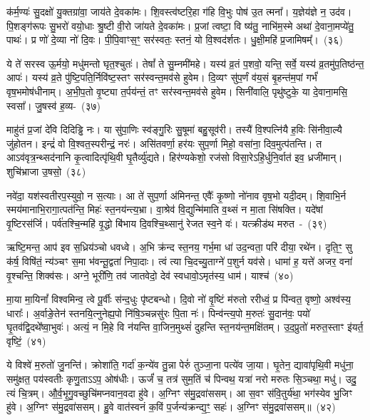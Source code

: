 क॑र्म॒ण्यः॑ सु॒दक्षो॑ यु॒क्तग्रा॑वा॒ जाय॑ते दे॒वका॑मः। शि॒वस्त्व॑ष्टरि॒हा ग॑हि वि॒भुः पोष॑ उ॒त त्मना᳚। य॒ज्ञेय॑ज्ञे न॒ उद॑व। पि॒शङ्ग॑रूपः सु॒भरो॑ वयो॒धाः श्रु॒ष्टी वी॒रो जा॑यते दे॒वका॑मः। प्र॒जां त्वष्टा॒ वि ष्य॑तु॒ नाभि॑म॒स्मे अथा॑ दे॒वाना॒मप्ये॑तु॒ पाथः॑। प्र णो॑ दे॒व्या नो॑ दि॒वः। पी॒पि॒वाꣳस॒ꣳ॒ सर॑स्वतः॒ स्तनं॒ यो वि॒श्वद॑र्\mbox{}शतः। धु॒क्षी॒महि॑ प्र॒जामिषम्᳚।~(३६)

ये ते॑ सरस्व ऊ॒र्मयो॒ मधु॑मन्तो घृत॒श्चुतः॑। तेषां᳚ ते सु॒म्नमी॑महे। यस्य॑ व्र॒तं प॒शवो॒ यन्ति॒ सर्वे॒ यस्य॑ व्र॒तमु॑प॒तिष्ठ॑न्त॒ आपः॑। यस्य॑ व्र॒ते पु॑ष्टि॒पति॒र्निवि॑ष्ट॒स्तꣳ सर॑स्वन्त॒मव॑से हुवेम। दि॒व्यꣳ सु॑प॒र्णं व॑य॒सं बृ॒हन्त॑म॒पां गर्भं॑ वृष॒भमोष॑धीनाम्। अ॒भी॒प॒तो वृ॒ष्ट्या त॒र्पय॑न्तं॒ तꣳ सर॑स्वन्त॒मव॑से हुवेम। सिनी॑वालि॒ पृथु॑ष्टुके॒ या दे॒वाना॒मसि॒ स्वसा᳚। जु॒षस्व॑ ह॒व्य-~(३७)

माहु॑तं प्र॒जां दे॑वि दिदिड्ढि नः। या सु॑पा॒णिः स्व॑ङ्गु॒रिः सु॒षूमा॑ बहु॒सूव॑री। तस्यै॑ वि॒श्पत्नि॑यै ह॒विः सि॑नीवा॒ल्यै जु॑होतन। इन्द्रं॑ वो वि॒श्वत॒स्परीन्द्रं॒ नरः॑। असि॑तवर्णा॒ हर॑यः सुप॒र्णा मिहो॒ वसा॑ना॒ दिव॒मुत्प॑तन्ति। त आ\-ऽव॑वृत्र॒न्थ्सद॑नानि कृ॒त्वादित्पृ॑थि॒वी घृ॒तैर्व्यु॑द्यते। हिर॑ण्यकेशो॒ रज॑सो विसा॒रे\-ऽहि॒र्धुनि॒र्वात॑ इव॒ ध्रजी॑मान्। शुचि॑भ्राजा उ॒षसो॒~(३८)

नवे॑दा॒ यश॑स्वतीरप॒स्युवो॒ न स॒त्याः। आ ते॑ सुप॒र्णा अ॑मिनन्त॒ एवैः᳚ कृ॒ष्णो नो॑नाव वृष॒भो यदी॒दम्। शि॒वाभि॒र्न स्मय॑\-माना\-भि॒रागा॒त्पत॑न्ति॒ मिहः॑ स्त॒नय॑न्त्य॒भ्रा। वा॒श्रेव॑ वि॒द्युन्मि॑माति व॒थ्सं न मा॒ता सि॑षक्ति। यदे॑षां वृ॒ष्टिरस॑र्जि। पर्व॑तश्चि॒न्महि॑ वृ॒द्धो बि॑भाय दि॒वश्चि॒थ्सानु॑ रेजत स्व॒ने वः॑। यत्क्रीड॑थ मरुत~-~(३९)

ऋष्टि॒मन्त॒ आप॑ इव स॒ध्रिय॑ञ्चो धवध्वे। अ॒भि क्र॑न्द स्त॒नय॒ गर्भ॒मा धा॑ उद॒न्वता॒ परि॑ दीया॒ रथे॑न। दृति॒ꣳ॒ सु क॑र्\mbox{}ष॒ विषि॑तं॒ न्य॑ञ्चꣳ स॒मा भ॑वन्तू॒द्वता॑ निपा॒दाः। त्वं त्या चि॒दच्यु॒ताग्ने॑ प॒शुर्न यव॑से। धामा॑ ह॒ यत्ते॑ अजर॒ वना॑ वृ॒श्चन्ति॒ शिक्व॑सः। अग्ने॒ भूरी॑णि॒ तव॑ जातवेदो॒ देव॑ स्वधावो॒\-ऽमृत॑स्य॒ धाम॑। याश्च॑~(४०)

मा॒या मा॒यिनां᳚ विश्वमिन्व॒ त्वे पू॒र्वीः स॑न्द॒धुः पृ॑ष्टबन्धो। दि॒वो नो॑ वृ॒ष्टिं म॑रुतो ररीध्वं॒ प्र पि॑न्वत॒ वृष्णो॒ अश्व॑स्य॒ धाराः᳚। अ॒र्वाङे॒तेन॑ स्तनयि॒त्नुनेह्य॒पो नि॑षि॒ञ्चन्नसु॑रः पि॒ता नः॑। पिन्व॑न्त्य॒पो म॒रुतः॑ सु॒\-दान॑वः॒ पयो॑ घृ॒तव॑द्वि॒दथे᳚ष्वा॒भुवः॑। अत्यं॒ न मि॒हे वि न॑यन्ति वा॒जिन॒\-मुथ्सं॑ दुहन्ति स्त॒नय॑न्त॒मक्षि॑तम्। उ॒द॒प्रुतो॑ मरुत॒स्ताꣳ इ॑यर्त॒ वृष्टिं॒~(४१)

ये विश्वे॑ म॒रुतो॑ जु॒नन्ति॑। क्रोशा॑ति॒ गर्दा॑ क॒न्ये॑व तु॒न्ना पेरुं॑ तुञ्जा॒ना पत्ये॑व जा॒या। घृ॒तेन॒ द्यावा॑पृथि॒वी मधु॑ना॒ समु॑क्षत॒ पय॑स्वतीः कृणु॒ताऽऽप॒ ओष॑धीः। ऊर्जं॑ च॒ तत्र॑ सुम॒तिं च॑ पिन्वथ॒ यत्रा॑ नरो मरुतः सि॒ञ्चथा॒ मधु॑। उदु॒ त्यं चि॒त्रम्। औ॒र्व॒भृ॒गु॒वच्छुचि॑मप्नवान॒वदा हु॑वे। अ॒ग्निꣳ स॑मु॒द्रवा॑ससम्। आ स॒वꣳ स॑वि॒तुर्य॑था॒ भग॑स्येव भु॒जिꣳ हु॑वे। अ॒ग्निꣳ स॑मु॒द्रवा॑ससम्। हु॒वे वात॑स्वनं क॒विं प॒र्जन्य॑क्रन्द्य॒ꣳ॒ सहः॑। अ॒ग्निꣳ स॑मु॒द्रवा॑ससम्॥~(४२)


